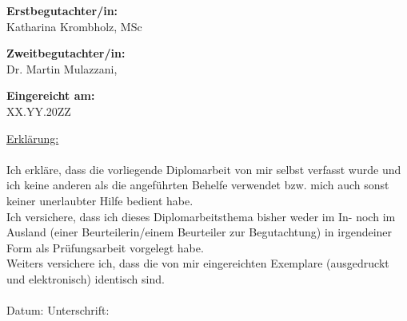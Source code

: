 \begin{center}
\hspace*{-1.0cm} \textbf{Erstbegutachter/in:} \\
\hspace*{-1.0cm} Katharina Krombholz, MSc \\

\vspace{0.5cm}

\hspace*{-1.0cm} \textbf{Zweitbegutachter/in:} \\
\hspace*{-1.0cm} Dr. Martin Mulazzani, \\


\vspace{1.4cm}

\hspace*{-1.0cm} \textbf{Eingereicht am:} \\
\hspace*{-1.0cm} XX.YY.20ZZ \\

\end{center}

\newpage

\pagestyle{empty}

\vspace*{16.5cm}  %

\hspace*{-0.7cm} \underline{Erklärung:}\\\\
Ich erkläre, dass die vorliegende Diplomarbeit von mir selbst verfasst wurde und ich keine anderen als die angeführten Behelfe verwendet bzw. mich auch sonst keiner unerlaubter Hilfe bedient habe.\\
Ich versichere, dass ich dieses Diplomarbeitsthema bisher weder im In- noch im Ausland (einer Beurteilerin/einem Beurteiler zur Begutachtung) in irgendeiner Form als Prüfungsarbeit vorgelegt habe.\\
Weiters versichere ich, dass die von mir eingereichten Exemplare (ausgedruckt und elektronisch) identisch sind.\\\\
Datum: \hspace{6cm} Unterschrift:\\






